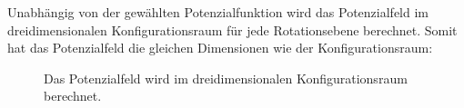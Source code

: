 Unabhängig von der gewählten Potenzialfunktion wird das Potenzialfeld im dreidimensionalen Konfigurationsraum für jede Rotationsebene berechnet.
Somit hat das Potenzialfeld die gleichen Dimensionen wie der Konfigurationsraum:

\begin{figure}[h!]
	\centering
	\footnotesize
	\centerline{}
	\caption{Das Potenzialfeld wird im dreidimensionalen Konfigurationsraum berechnet.}
\end{figure}


